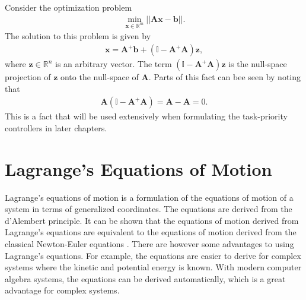 Consider the optimization problem
\begin{align}
    \min_{\bm{x} \in \mathbb{R}^m} || \bm{A} \bm{x} - \bm{b} ||.
\end{align}
The solution to this problem is given by
\begin{align}
    \bm{x} = \bm{A}^{+} \bm{b} + (\mathbb{I} - \bm{A}^{+} \bm{A}) \bm{z},
\end{align}
where $\bm{z} \in \mathbb{R}^n$ is an arbitrary vector. The term $(\mathbb{I} - \bm{A}^{+} \bm{A}) \bm{z}$
is the null-space projection of $\bm{z}$ onto the null-space of $\bm{A}$. Parts
of this fact can bee seen by noting that
\begin{align}
    \bm{A}\left(\mathbb{I} - \bm{A}^{+} \bm{A}\right) = \bm{A} - \bm{A} = 0.
\end{align}
This is a fact that will be used extensively when formulating the task-priority
controllers in later chapters.

\section{Lagrange's Equations of Motion}
\label{sec:lagrange}
Lagrange's equations of motion is a formulation of the equations of motion of a
system in terms of generalized coordinates. The equations are derived from the
d'Alembert principle. It can be shown that the equations of motion derived from
Lagrange's equations are equivalent to the equations of motion derived from
the classical Newton-Euler equations \cite{modsim}. There are however some advantages to using
Lagrange's equations. For example, the equations are easier to derive for complex
systems where the kinetic and potential energy is known. With modern computer
algebra systems, the equations can be derived automatically, which is
a great advantage for complex systems.

